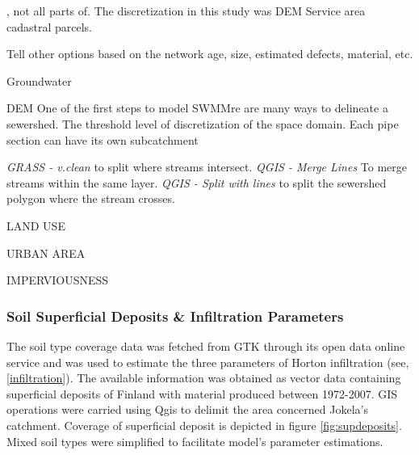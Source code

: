 , not all parts of.
The discretization in this study was DEM  Service area cadastral parcels.

Tell other options based on the network age, size, estimated defects, material, etc. 


Groundwater
         
DEM One of the first steps to model SWMMre are many ways to delineate a sewershed. The threshold level of discretization of the space domain. Each pipe section can have its own subcatchment 
          
          
         \textit{GRASS - v.clean} to split where streams intersect.
         \textit{QGIS - Merge Lines} To merge streams within the same layer. 
         \textit{QGIS - Split with lines} to split the sewershed polygon where the stream crosses.    
    
    

    
    LAND USE
    
    
    URBAN AREA
    
    IMPERVIOUSNESS







\subsubsection{Soil Superficial Deposits \& Infiltration Parameters}
\label{infiltrationcs}
    
The soil type coverage data was fetched from \acf{GTK} \cite{gtkdata} through its open data online service and was used to estimate the three parameters of Horton infiltration (see, \ref{infiltration}). The available information was obtained as vector data containing superficial deposits of Finland with material produced between 1972-2007. GIS operations were carried using Qgis to delimit the area concerned Jokela's catchment. Coverage of superficial deposit is depicted in figure \ref{fig:supdeposits}. Mixed soil types were simplified to facilitate model's parameter estimations.\\
    
